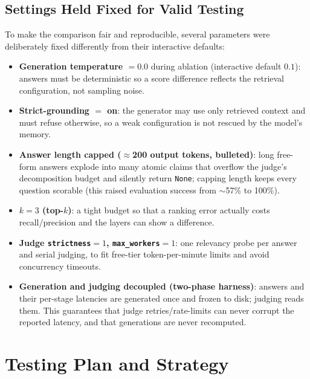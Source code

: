 \documentclass[12pt,a4paper]{report}
\begin{document}
\subsection{Settings Held Fixed for Valid Testing}
To make the comparison fair and reproducible, several parameters were deliberately
fixed differently from their interactive defaults:
\begin{itemize}[nosep]
  \item \textbf{Generation temperature $=0.0$} during ablation (interactive
        default $0.1$): answers must be deterministic so a score difference
        reflects the retrieval configuration, not sampling noise.
  \item \textbf{Strict-grounding $=$ on}: the generator may use only retrieved
        context and must refuse otherwise, so a weak configuration is not rescued
        by the model's memory.
  \item \textbf{Answer length capped ($\approx$200 output tokens, bulleted)}:
        long free-form answers explode into many atomic claims that overflow the
        judge's decomposition budget and silently return \texttt{None}; capping
        length keeps every question scorable (this raised evaluation success from
        $\sim$57\% to 100\%).
  \item \textbf{$k=3$ (top-$k$)}: a tight budget so that a ranking error actually
        costs recall/precision and the layers can show a difference.
  \item \textbf{Judge \texttt{strictness}$=1$, \texttt{max\_workers}$=1$}: one
        relevancy probe per answer and serial judging, to fit free-tier
        token-per-minute limits and avoid concurrency timeouts.
  \item \textbf{Generation and judging decoupled (two-phase harness)}: answers and
        their per-stage latencies are generated once and frozen to disk; judging
        reads them. This guarantees that judge retries/rate-limits can never
        corrupt the reported latency, and that generations are never recomputed.
\end{itemize}

\section{Testing Plan and Strategy}
\end{document}
